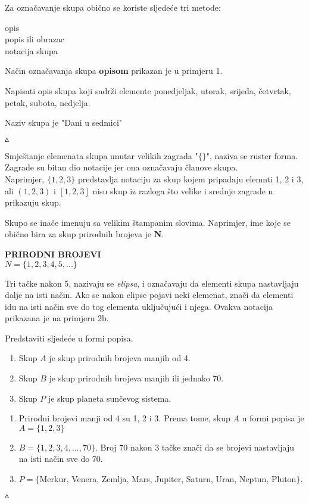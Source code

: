 \documentclass[a4paper,14pt,svgnames]{article}
\newcounter{counter}
\newcommand{\examplecounter}{\textbf{\refstepcounter{counter}PRIMJER \thecounter}}
\newcommand{\example}[3]{\begin{tcolorbox}[title=\large \examplecounter \hfill\small\textbf{"#1"}]
#2
\begin{tcolorbox}[title=\small \textbf{RJEŠENJE},colback=white]
\begin{center}
#3

\vspace{0.5em}\hfill $\vartriangle$
\end{center}
\end{tcolorbox}
\end{tcolorbox}}
\begin{document}
Za označavanje skupa obično se koriste sljedeće tri metode:
\begin{center}
opis\\
popis ili obrazac\\
notacija skupa
\end{center}
Način označavanja skupa \textbf{opisom} prikazan je u primjeru 1.
\example{Opis skupova}{Napisati opis skupa koji sadrži elemente ponedjeljak, utorak, srijeda, četvrtak, petak, subota, nedjelja.}{Naziv skupa je "Dani u sedmici"}

Smještanje elemenata skupa unutar velikih zagrada "$\{ \}$", naziva se ruster forma. Zagrade su bitan dio notacije jer ona označavaju članove skupa.\\
Naprimjer, $\{1, 2, 3\}$ predstavlja notaciju za skup kojem pripadaju elemnti 1, 2 i 3, ali $(1, 2, 3)$ i $[1, 2, 3]$ nisu skup iz razloga što velike i srednje zagrade n prikazuju skup.

Skupo se inače imenuju sa velikim štampanim slovima. Naprimjer, ime koje se obično bira za skup prirodnih brojeva je \textbf{N}.\\
\begin{tcolorbox}
\begin{center}
\textbf{\textsc{PRIRODNI BROJEVI}}\\
$N = \{1, 2, 3, 4, 5, ... \}$
\end{center}
\end{tcolorbox}
Tri tačke nakon 5, nazivaju se \textit{elipsa}, i označavaju da elementi skupa nastavljaju dalje na isti način. Ako se nakon elipse pojavi neki elemenat, znači da elementi idu na isti način sve do tog elementa uključujući i njega. Ovakva notacija prikazana je na primjeru 2b.
\example{Skup u formi popisa}{Predstaviti sljedeće u formi popisa.\begin{enumerate}[label=\alph*),leftmargin=0.5cm]
\item Skup $A$ je skup prirodnih brojeva manjih od 4.
\item Skup $B$ je skup prirodnih brojeva manjih ili jednako 70.
\item Skup $P$ je skup planeta sunčevog sistema.
\end{enumerate}}{\begin{enumerate}[label=\alph*),leftmargin=0.5cm]
\item Prirodni brojevi manji od 4 su 1, 2 i 3. Prema tome, skup $A$ u formi popisa je $A=\{1,2,3\}$
\item $B=\{1, 2, 3, 4, ... , 70\}$. Broj 70 nakon 3 tačke znači da se brojevi nastavljaju na isti način sve do 70.
\item $P=\{$Merkur, Venera, Zemlja, Mars, Jupiter, Saturn, Uran, Neptun, Pluton$\}$.
\end{enumerate}}
\end{document}
